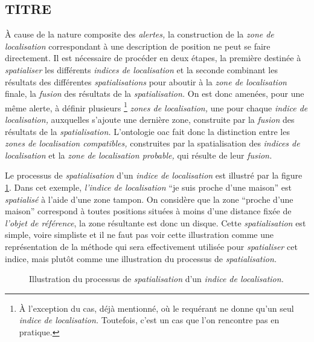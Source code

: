 \subsection{TITRE}

À cause de la nature composite des \emph{alertes,} la construction de
la \emph{zone de localisation} correspondant à une description de
position ne peut se faire directement. Il est nécessaire de procéder
en deux étapes, la première destinée à \emph{spatialiser} les
différents \emph{indices de localisation} et la seconde combinant les
résultats des différentes \emph{spatialisations} pour aboutir à la
\emph{zone de localisation} finale, \ie la \emph{fusion} des résultats
de la \emph{spatialisation.} On est donc amenées, pour une même
alerte, à définir plusieurs \footnote{À l'exception du cas, déjà
  mentionné, où le requérant ne donne qu'un seul \emph{indice de
    localisation.}  Toutefois, c'est un cas que l'on rencontre pas en
  pratique.}  \emph{zones de localisation,} une pour chaque
\emph{indice de localisation,} auxquelles s'ajoute une dernière zone,
construite par la \emph{fusion} des résultats de la
\emph{spatialisation.}  L'ontologie \ac{oac} \autocite{Viry2019} fait
donc la distinction entre les \emph{zones de localisation
  compatibles,} construites par la spatialisation des \emph{indices de
  localisation} et la \emph{zone de localisation probable,} qui
résulte de leur \emph{fusion.}

Le processus de \emph{spatialisation} d'un \emph{indice de
  localisation} est illustré par la figure \ref{fig:obj_spa}. Dans cet
exemple, \emph{l'indice de localisation} \enquote{je suis proche d'une
  maison} est \emph{spatialisé} à l'aide d'une zone tampon. On
considère que la zone \enquote{proche d'une maison} correspond à
toutes positions situées à moins d'une distance fixée de \emph{l'objet
  de référence}, la zone résultante est donc un disque. Cette
\emph{spatialisation} est simple, voire simpliste et il ne faut pas
voir cette illustration comme une représentation de la méthode qui
sera effectivement utilisée pour \emph{spatialiser} cet indice, mais
plutôt comme une illustration du processus de \emph{spatialisation.}

\begin{figure}[hb]
  \centering
  
  \caption{Illustration du processus de \emph{spatialisation} d'un
    \emph{indice de localisation.}}
  \label{fig:obj_spa}
\end{figure}

